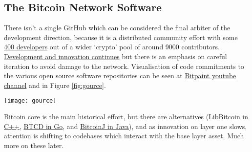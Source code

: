 \subsection{The Bitcoin Network Software}
There isn't a single GitHub which can be considered the final arbiter of the development direction, because it is a distributed community effort with some \href{https://decrypt.co/66740/who-are-the-fastest-growing-developer-communities-in-crypto}{400 developers} out of a wider `crypto' pool of around 9000 contributors. \href{https://bitcoinops.org/en/newsletters/2021/12/22/}{Development and innovation continues} but there is an emphasis on careful iteration to avoid damage to the network. Visualisation of code commitments to the various open source software repositories can be seen at \href{https://www.youtube.com/channel/UC4DT4qudqogkmbqVAQy8eFg/videos}{Bitpaint youtube channel} and in Figure \ref{fig:gource}.\par
\begin{figure*}[ht]\centering %
	\texttt{[image: gource]}
	\caption{\href{https://github.com/bitpaint/bitcoin-gources}{Bitpaint}: Contributions to the Bitcoin ecosystem. Reused with permission.}
	\label{fig:gource}
\end{figure*}
\href{https://github.com/bitcoin/}{Bitcoin core} is the main historical effort, but there are alternatives (\href{https://github.com/libbitcoin/libbitcoin-node/wiki}{LibBitcoin in C++}, \href{https://github.com/btcsuite/btcd}{BTCD in Go}, and \href{https://bitcoinj.github.io/getting-started}{BitcoinJ in Java}), and as innovation on layer one slows, attention is shifting to codebases which interact with the base layer asset. Much more on these later.
